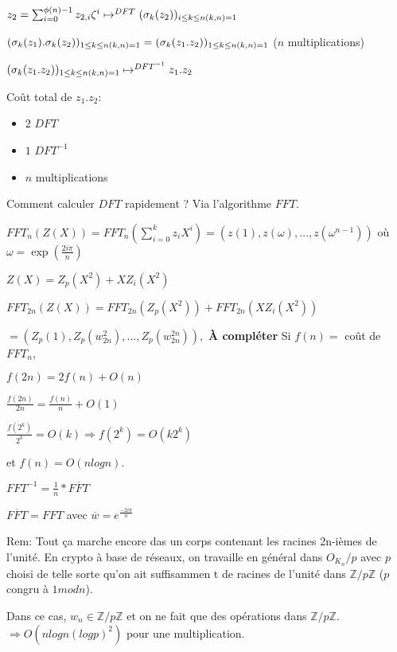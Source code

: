 $z_2 = \sum_{i=0}^{\phi(n)-1} z_{2,i} \zeta^i \mapsto^{DFT} (\sigma_k(z_2))_{i\le k \le n \\ (k, n)=1}$

$(\sigma_k(z_1).\sigma_k(z_2))_{1\le k \le n \\ (k, n)=1} = (\sigma_k(z_1.z_2))_{1\le k \le n \\ (k, n)=1}$ ($n$ multiplications)

$(\sigma_k(z_1.z_2))_{1\le k \le n \\ (k, n)=1} \mapsto^{DFT^{-1}} z_1.z_2$

Coût total de $z_1.z_2$:
\begin{itemize}
	\item $2$ $DFT$
	\item $1$ $DFT^{-1}$
	\item $n$ multiplications
\end{itemize}

Comment calculer $DFT$ rapidement ? Via l'algorithme $FFT$.

$FFT_n(Z(X))=FFT_n(\sum_{i=0}^k z_i X^i)=(z(1), z(\omega), \dots, z(\omega^{n-1}))$
où $\omega =\exp(\frac{2i\pi}{n})$

$Z(X)=Z_p(X^2) + XZ_i(X^2)$

$FFT_{2n}(Z(X))=FFT_{2n}(Z_p(X^2))+FFT_{2n}(X Z_i(X^2))$

$=(Z_p(1),Z_p(w_{2n}^2),...,Z_p(w_{2n}^{2n})),$
\textbf{À compléter}
Si $f(n)=$ coût de $FFT_n$,

$f(2n)=2f(n)+O(n)$

$\frac{f(2n)}{2n}=\frac{f(n)}{n}+O(1)$

$\frac{f(2^k)}{2^k}=O(k) \Rightarrow f(2^k)=O(k 2^k)$

et $f(n)=O(n log n)$.

\begin{proposition}
$FFT^{-1}=\frac{1}{n}* \overline{FFT}$

$\overline{FFT}=FFT$ avec $\overline{w}=e^{\frac{-2 i \pi}{n}}$
\end{proposition}

Rem: Tout ça marche encore das un corps contenant les racines 2n-ièmes de l'unité. En crypto à base de réseaux, on travaille en général dans $O_{K_n}/p$ avec $p$ choisi de telle sorte qu'on ait suffisammen t de racines de l'unité dans $\mathbb{Z}/p \mathbb{Z}$ ($p$ congru à $1 mod n$). 

Dans ce cas, $w_n \in \mathbb{Z}/p \mathbb{Z}$ et on ne fait que des opérations dans $\mathbb{Z}/p \mathbb{Z}$.
$\Rightarrow O(n log n (log p)^2)$ pour une multiplication.

